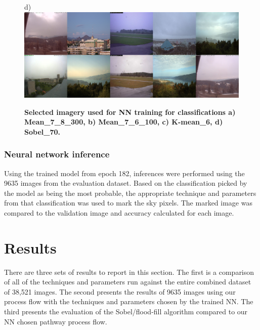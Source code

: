 \documentclass[final,3p,times,authoryear]{elsarticle}
\begin{document}
\begin{figure}
d)\includegraphics[trim = 0mm 0mm 0mm 0mm,clip,scale=0.14]{Images/13-9_Sobel_70_tiles.png}
\caption{\textbf{Selected imagery used for NN training for classifications 
a) Mean\_7\_8\_300, 
b) Mean\_7\_6\_100, 
c) K-mean\_6, 
d) Sobel\_70.}}
\label{fig:classImages}
\end{figure}



\subsubsection{Neural network inference}\label{sec:nninference}    
Using the trained model from epoch 182, inferences were performed using the 9635 images from the evaluation dataset. Based on the classification picked by the model as being the most probable, the appropriate technique and parameters from that classification was used to mark the sky pixels. The marked image was compared to the validation image and accuracy calculated for each image.

\section{Results}\label{sec:results}


There are three sets of results to report in this section. The first is a comparison of all of the techniques and parameters run against the entire combined dataset of 38,521 images. The second presents the results of 9635 images using our process flow with the techniques and parameters chosen by the trained NN. The third presents the evaluation of the Sobel/flood-fill algorithm compared to our NN chosen pathway process flow.
\end{document}
